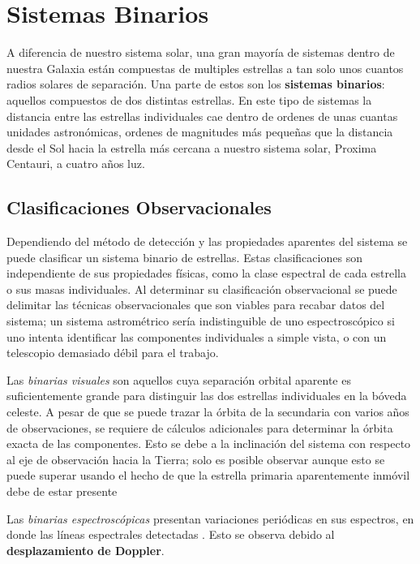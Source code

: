 \section{Sistemas Binarios}

A diferencia de nuestro sistema solar, una gran mayoría de sistemas dentro de
nuestra Galaxia están compuestas de multiples estrellas a tan solo unos cuantos
radios solares de separación. Una parte de estos son los \textbf{sistemas
binarios}: aquellos compuestos de dos distintas estrellas. En este tipo de
sistemas la distancia entre las estrellas individuales cae dentro de ordenes de
unas cuantas unidades astronómicas, ordenes de magnitudes más pequeñas que la
distancia desde el Sol hacia la estrella más cercana a nuestro sistema solar,
Proxima Centauri, a cuatro años luz. 

\subsection{Clasificaciones Observacionales}

Dependiendo del método de detección y las propiedades aparentes del sistema se
puede clasificar un sistema binario de estrellas. Estas clasificaciones son
independiente de sus propiedades físicas, como la clase espectral de cada
estrella o sus masas individuales. Al determinar su clasificación observacional
se puede delimitar las técnicas observacionales que son viables para recabar
datos del sistema; un sistema astrométrico sería indistinguible de uno
espectroscópico si uno intenta identificar las componentes individuales a simple
vista, o con un telescopio demasiado débil para el trabajo.

Las \textit{binarias visuales} son aquellos cuya separación orbital aparente es
suficientemente grande para distinguir las dos estrellas individuales en la
bóveda celeste. A pesar de que se puede trazar la órbita de la secundaria con
varios años de observaciones, se requiere de cálculos adicionales para
determinar la órbita exacta de las componentes. Esto se debe a la inclinación
del sistema con respecto al eje de observación hacia la Tierra; solo es posible
observar  \citet{fundamentalAstronomy::chapter10_binaryStars} aunque esto se puede
superar usando el hecho de que la estrella primaria aparentemente inmóvil debe
de estar presente 

Las \textit{binarias espectroscópicas} presentan variaciones periódicas en sus
espectros, en donde las líneas espectrales detectadas 
\citet{astronomyPhysicalPerspective::chapter5_binaryStars}. Esto se observa
debido al \textbf{desplazamiento de Doppler}. 


